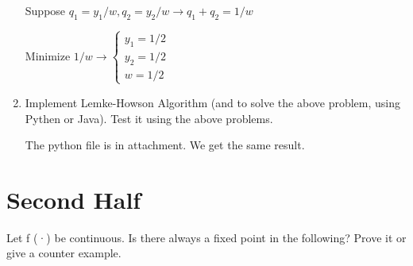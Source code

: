 \documentclass{article}
\newenvironment{answer}{\par\color{ForestGreen}}{\par}
\begin{document}
\begin{enumerate}
\begin{answer}
      Suppose $q_1 = y_1/w, q_2 = y_2 /w \rightarrow q_1 + q_2 = 1/w$

      Minimize $1/w \rightarrow
      \begin{cases}
        y_1 = 1/2 \\
        y_2 = 1/2 \\
        w = 1/2
     \end{cases}
      $

    \end{answer}

    \item
    Implement Lemke-Howson Algorithm (and to solve the above problem, using Pythen or Java). Test it using the above problems.

    \begin{answer}
      The python file is in attachment. We get the same result.
    \end{answer}

\end{enumerate}

\section{Second Half}
Let f (·) be continuous. Is there always a fixed point in the following? Prove it or give a counter example.
\end{document}

